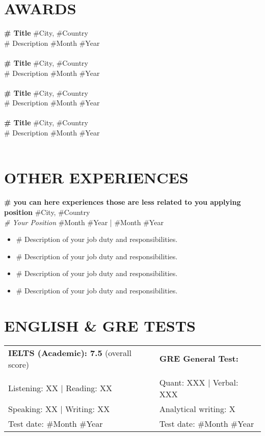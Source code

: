\documentclass[a4paper,9pt]{extarticle}
\begin{document}
\section*{AWARDS}
\textbf{\# Title}  \hfill \#City, \#Country\\ 
\# Description \hfill \#Month \#Year\\ \\
\textbf{\# Title}  \hfill \#City, \#Country\\ 
\# Description \hfill \#Month \#Year\\ \\
\textbf{\# Title}  \hfill \#City, \#Country\\ 
\# Description \hfill \#Month \#Year\\ \\
\textbf{\# Title}  \hfill \#City, \#Country\\ 
\# Description \hfill \#Month \#Year\\ \\

\section*{OTHER EXPERIENCES}
\noindent
\textbf{\# you can here experiences those are less related to you applying position}  \hfill \#City, \#Country\\ %
\textit{\# Your Position} \hfill \#Month \#Year | \#Month \#Year %
\begin{itemize}
    \item \# Description of your job duty and responsibilities.
    \item \# Description of your job duty and responsibilities.
    \item \# Description of your job duty and responsibilities.
    \item \# Description of your job duty and responsibilities.
\end{itemize}


\section*{ENGLISH \& GRE TESTS}
    \begin{tabularx}{1\textwidth}{
    >{\raggedright\arraybackslash}X 
   >{\raggedright\arraybackslash}X }
      \textbf{IELTS (Academic): 7.5} (overall score)&   \textbf{GRE General Test:}\\ \\
    Listening: XX | Reading: XX & Quant: XXX | Verbal: XXX\\
    Speaking: XX   | Writing: XX& Analytical writing: X\\
    Test date: \#Month \#Year &Test date: \#Month \#Year
    \end{tabularx}
\end{document}
